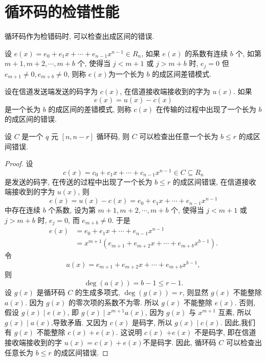 \section{循环码的检错性能}

循环码作为检错码时, 可以检查出成区间的错误.
\begin{definition}
    设 $ e(x)=e_{0}+e_{1} x+\cdots+e_{n-1} x^{n-1} \in R_{n} $, 如果 $ e(x) $ 的系数有连续 $ b $ 个, 如第 $ m+1, m+2, \cdots, m+b $ 个, 使得当 $ j<m+1 $ 或 $ j>m+b $ 时, $ e_{j}=0 $ 但 $ e_{m+1} \neq 0, e_{m+b} \neq 0 $, 则称 $ e(x) $为一个长为 $ b $ 的成区间差错模式.
\end{definition}

设在信道发送端发送的码字为 $ c(x) $, 在信道接收端接收到的字为 $ u(x) $. 如果
$$
e(x)=u(x)-c(x)
$$
是一个长为 $ b $ 的成区间的差错模式, 则称 $ c(x) $ 在传输的过程中出现了一个长为 $ b $ 的成区间的错误.

\begin{theorem}
设 $ C $ 是一个 $ q $ 元 $ [n, n-r] $ 循环码, 则 $ C $ 可以检查出任意一个长为 $ b \leq r $ 的成区间错误.
\end{theorem}
\begin{proof}
 设
$$
c(x)=c_{0}+c_{1} x+\cdots+c_{n-1} x^{n-1} \in C \subseteq R_{n}
$$
是发送的码字, 在传送的过程中出现了一个长为 $ b \leq r $ 的成区间错误, 在信道接收端接收到的字为 $ u(x) $, 则
$$
e(x)=u(x)-c(x)=e_{0}+e_{1} x+\cdots+e_{n-1} x^{n-1}
$$
中存在连续 $ b $ 个系数, 设为第 $ m+1, m+2, \cdots, m+b $ 个, 使得当 $ j<m+1 $ 或 $ j>m+b $ 时, $ e_{j}=0 $, 而 $ e_{m+b} \neq 0 $. 于是
$$
\begin{aligned}
e(x) & =e_{0}+e_{1} x+\cdots+e_{n-1} x^{n-1} \\
& =x^{m+1}\left(e_{m+1}+e_{m+2} x+\cdots+e_{m+b} x^{b-1}\right) .
\end{aligned}
$$
令
$$
a(x)=e_{m+1}+e_{m+2} x+\cdots+e_{m+b} x^{b-1},
$$
则
$$
\operatorname{deg}(a(x))=b-1 \leq r-1 .
$$
设 $ g(x) $ 是循环码 $ C $ 的生成多项式, $ \operatorname{deg}(g(x))=r $, 则显然 $ g(x) $ 不能整除 $ a(x) $. 因为 $ g(x) $ 的零次项的系数不为零. 所以 $ g(x) $ 不能整除 $ e(x) $. 否则, 假设 $ g(x) \mid e(x) $, 即 $ g(x) \mid x^{m+1} a(x) $, 因为 $ g(x) $ 与 $ x^{m+1} $ 互素, 所以 $ g(x) \mid a(x) $,导致矛盾. 又因为 $ c(x) $ 是码字, 所以 $ g(x) \mid c(x) $. 因此,我们有 $ g(x) $ 不能整除 $ c(x)+e(x) $. 这说明 $ c(x) $ $ +e(x) $ 不是码字, 即在信道接收端接收到的字 $ u(x)=c(x)+e(x) $不是码字. 因此, 循环码 $ C $ 可以检查出任意长为 $ b \leq r $ 的成区间错误.
\end{proof}
